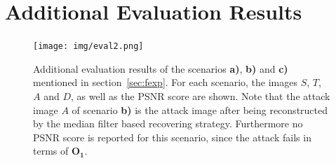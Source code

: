 \documentclass[sigconf]{acmart}
\begin{document}
\newpage
\appendix

\section{Additional Evaluation Results}
\label{sec:app}

\begin{figure}[h]
  \centering
  \texttt{[image: img/eval2.png]}
  \caption{Additional evaluation results of the scenarios \textbf{a)}, \textbf{b)} and \textbf{c)} mentioned in section~\ref{sec:fexp}. For each scenario, the images $S$, $T$, $A$ and $D$, as well as the PSNR score are shown. 
  		Note that the attack image $A$ of scenario \textbf{b)} is the attack image after being reconstructed by the median filter based recovering strategy. Furthermore no PSNR score is reported for this scenario, since the attack fails in terms of $\boldsymbol{O_1}$.}
  \Description{}
  \label{fig:results2}
\end{figure}
\end{document}
